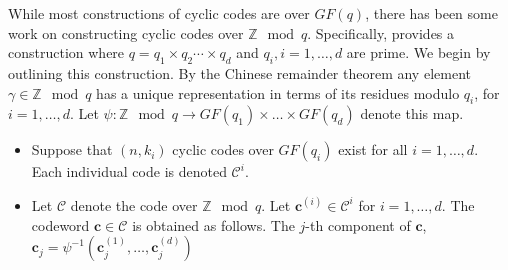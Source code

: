 \documentclass[journal,twocolumn]{IEEEtran}
\theoremstyle{definition}
\newcommand{\calC}{\mathcal{C}}
\newcommand{\calS}{\mathcal{S}}
\newcommand{\bfc}{\mathbf{c}}
\newcommand{\bfT}{\mathbf{T}}
\newcommand{\bfG}{\mathbf{G}}
\newcommand{\bfI}{\mathbf{I}}
\newcommand{\litang}[1]{\marginpar{+}{\bf Li's remark}: {\em #1}}
\begin{document}
%
%

While most constructions of cyclic codes are over $GF(q)$, there has been some work on constructing cyclic codes over $\mathbb{Z}\mod q$. Specifically, \cite{blake1972codes} provides a construction where $q=q_1\times q_2 \cdots \times q_d$ and $q_i, i = 1, \dots, d$ are prime. We begin by outlining this construction. By the Chinese remainder theorem any element $ \gamma \in \mathbb{Z}\mod q$ has a unique representation in terms of its residues modulo $q_i$, for $i=1, \dots, d$. Let $\psi: \mathbb{Z}\mod q \rightarrow GF(q_1) \times \dots \times GF(q_d)$ denote this map.
\begin{itemize}
\item Suppose that $(n,k_i)$ cyclic codes over $GF(q_i)$ exist for all $i = 1, \dots, d$. Each individual code is denoted $\calC^{i}$.
\item Let $\calC$ denote the code over $\mathbb{Z} \mod q$. Let $\bfc^{(i)} \in \calC^{i}$ for $i = 1, \dots, d$. The codeword $\bfc \in \calC$ is obtained as follows. The $j$-th component of $\bfc$, $\bfc_j = \psi^{-1}(\bfc^{(1)}_j, \dots, \bfc^{(d)}_j)$
\end{itemize}
\end{document}
